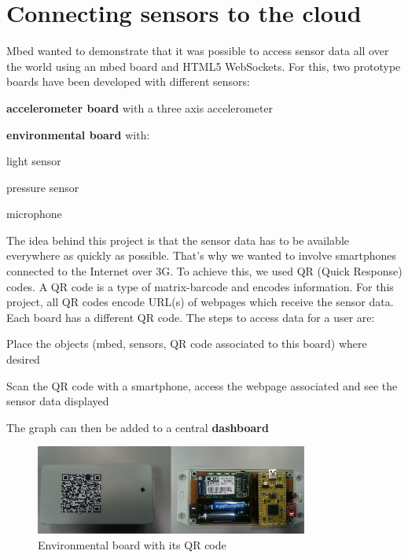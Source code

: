 \documentclass[pdftex,10pt,a4paper]{report}
\newenvironment{packed_item}{
\begin{itemize}
  \setlength{\itemsep}{1pt}
  \setlength{\parskip}{0pt}
  \setlength{\parsep}{0pt}
}{\end{itemize}}
\begin{document}
\newpage









\section{Connecting sensors to the cloud}
Mbed wanted to demonstrate that it was possible to access sensor data all over the world using an mbed board and HTML5 WebSockets. For this, two prototype boards have been developed with different sensors:

\begin{packed_item}
	\item \textbf{accelerometer board} with a three axis accelerometer
	\item \textbf{environmental board} with:
		\begin{packed_item}
			\item light sensor
			\item pressure sensor
			\item microphone
		\end{packed_item}
\end {packed_item}

The idea behind this project is that the sensor data has to be available everywhere as quickly as possible. That's why we wanted to involve smartphones connected to the Internet over 3G. To achieve this, we used QR (Quick Response) codes. A QR code is a type of matrix-barcode and encodes information. For this project, all QR codes encode URL(s) of webpages which receive the sensor data. Each board has a different QR code. The steps to access data for a user are:

\begin{packed_item}
	\item Place the objects (mbed, sensors, QR code associated to this board) where desired
	\item Scan the QR code with a smartphone, access the webpage associated and see the sensor data displayed
	\item The graph can then be added to a central \textbf{dashboard}
\end{packed_item}

\begin{figure}[h!]
		\centering
		\includegraphics[width=0.8\textwidth]{./env_board_qr.jpg}
		\caption{Environmental board with its QR code}
		\label{Environmental board with its QR code}
\end{figure}
\end{document}
